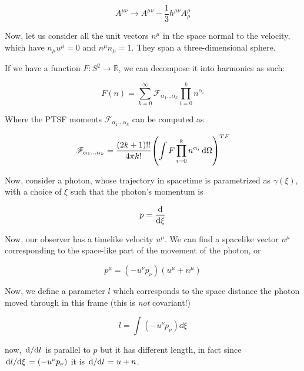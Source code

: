 \documentclass[main.tex]{subfiles}
\begin{document}
\begin{equation}
    A^{\mu\nu} \rightarrow A^{\mu\nu} - \frac{1}{3} h^{\mu\nu} A^{\rho}_\rho
\end{equation}

Now, let us consider all the unit vectors \(n^\mu\) in the space normal to the velocity, which have \(n_\mu u^\mu = 0\) and \(n^\mu n_\mu = 1\). They span a three-dimensional sphere.

If we have a function \(F\colon S^2 \rightarrow \mathbb R\), we can decompose it into harmonics as such:

\begin{equation}
    F(n) = \sum _{k=0}   ^{\infty}
    \mathscr F_{\alpha_1 \dots \alpha_k} \prod_{i=0}^k n^{\alpha_i}
\end{equation}

Where the PTSF moments \(\mathscr F_{\alpha_1 \dots \alpha_k}\) can be computed as

\begin{equation}
    \mathscr F_{\alpha_1 \dots \alpha_k} =
    \frac{(2k+1)!!}{4 \pi k!} \qty(\int F \prod_{i=0}^k n^{\alpha_i}  \dd{\Omega}  )^{TF}
\end{equation}

Now, consider a photon, whose trajectory in spacetime is parametrized as \(\gamma(\xi)\), with a choice of \(\xi\) such that the photon's momentum is

\begin{equation}
    p = \dv{}{\xi}
\end{equation}

Now, our observer has a timelike velocity \(u^\mu\). We can find a spacelike vector \(n^\mu\) corresponding to the space-like part of the movement of the photon, or

\begin{equation}
    p^\mu = (- u^\nu p_\nu) (u^\mu + n^\mu)
\end{equation}

Now, we define a parameter \(l\) which corresponds to the space distance the photon moved through in this frame (this is \emph{not} covariant!)

\begin{equation}
    l = \int  (-u^\nu p_\nu) \dd{\xi}
\end{equation}

now, \(\dv*{}{l} \) is parallel to \(p\) but it has different length, in fact since \(\dv*{l}{\xi} = (-u^\nu p_\nu) \) it is \(\dv*{}{l} = u + n \).
\end{document}
